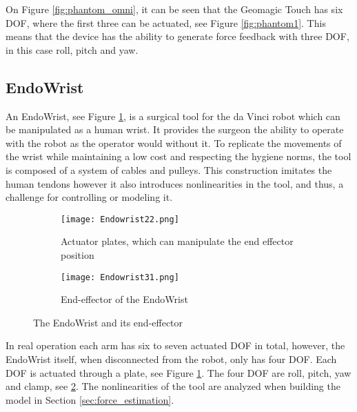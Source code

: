 On Figure \ref{fig:phantom_omni}, it can be seen that the Geomagic Touch has six DOF, where the first three can be actuated, see Figure \ref{fig:phantom1}. This means that the device has the ability to generate force feedback with three DOF, in this case roll, pitch and yaw.



    
\subsection{EndoWrist}\label{sec:EndoWrist}

{\color{green}An EndoWrist, see Figure \ref{fig:Endo_plates}, is a surgical tool for the da Vinci robot which can be manipulated as a human wrist. It provides the surgeon the ability to operate with the robot as the operator would without it. To replicate the movements of the wrist while maintaining a low cost and respecting the hygiene norms, the tool is composed of a system of cables and pulleys. This construction imitates the human tendons however it also introduces nonlinearities in the tool, and thus, a challenge for controlling or modeling it.

\begin{figure}[h]
  \centering
  \begin{subfigure}{.22\textwidth}
    \centering
    \texttt{[image: Endowrist22.png]}
    \caption{Actuator plates, which can manipulate the end effector position}
    \label{fig:Endo_plates}
  \end{subfigure}
  \begin{subfigure}{.22\textwidth}
    \centering
    \texttt{[image: Endowrist31.png]}
    \caption{End-effector of the EndoWrist\newline}
    \label{fig:Endo_end}
  \end{subfigure}
\caption{The EndoWrist and its end-effector}
\label{fig:endowrits_set}
\end{figure}

In real operation each arm has six to seven actuated DOF in total, however, the EndoWrist itself, when disconnected from the robot, only has four DOF. Each DOF is actuated through a plate, see Figure \ref{fig:Endo_plates}. The four DOF are roll, pitch, yaw and clamp, see \ref{fig:Endo_end}. The nonlinearities of the tool are analyzed when building the model in Section \ref{sec:force_estimation}.
}

